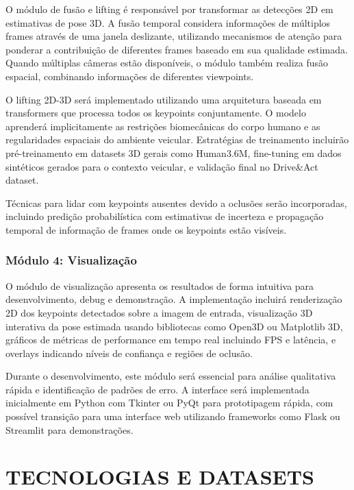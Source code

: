 \documentclass[12pt, a4paper]{article}
\begin{document}
O módulo de fusão e lifting é responsável por transformar as detecções 2D em estimativas de pose 3D. A fusão temporal considera informações de múltiplos frames através de uma janela deslizante, utilizando mecanismos de atenção para ponderar a contribuição de diferentes frames baseado em sua qualidade estimada. Quando múltiplas câmeras estão disponíveis, o módulo também realiza fusão espacial, combinando informações de diferentes viewpoints.

O lifting 2D-3D será implementado utilizando uma arquitetura baseada em transformers que processa todos os keypoints conjuntamente. O modelo aprenderá implicitamente as restrições biomecânicas do corpo humano e as regularidades espaciais do ambiente veicular. Estratégias de treinamento incluirão pré-treinamento em datasets 3D gerais como Human3.6M, fine-tuning em dados sintéticos gerados para o contexto veicular, e validação final no Drive\&Act dataset.

Técnicas para lidar com keypoints ausentes devido a oclusões serão incorporadas, incluindo predição probabilística com estimativas de incerteza e propagação temporal de informação de frames onde os keypoints estão visíveis.

\subsubsection{Módulo 4: Visualização}

O módulo de visualização apresenta os resultados de forma intuitiva para desenvolvimento, debug e demonstração. A implementação incluirá renderização 2D dos keypoints detectados sobre a imagem de entrada, visualização 3D interativa da pose estimada usando bibliotecas como Open3D ou Matplotlib 3D, gráficos de métricas de performance em tempo real incluindo FPS e latência, e overlays indicando níveis de confiança e regiões de oclusão.

Durante o desenvolvimento, este módulo será essencial para análise qualitativa rápida e identificação de padrões de erro. A interface será implementada inicialmente em Python com Tkinter ou PyQt para prototipagem rápida, com possível transição para uma interface web utilizando frameworks como Flask ou Streamlit para demonstrações.

\section{TECNOLOGIAS E DATASETS}
\end{document}
